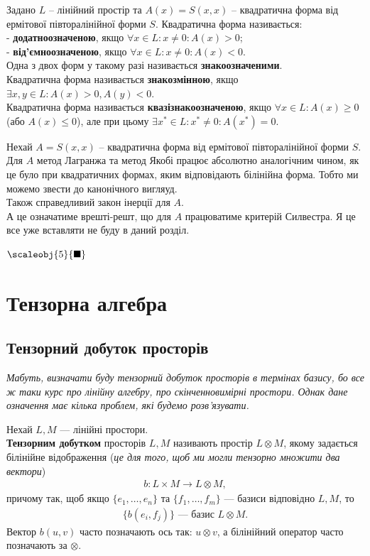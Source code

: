 \documentclass{math_library}
\begin{document}
\begin{definition}
Задано $L$ -- лінійний простір та $A(x) = S(x,x)$ -- квадратична форма від ермітової півторалінійної форми $S$. Квадратична форма називається:\\
- \textbf{додатноозначеною}, якщо $\forall x \in L: x \neq 0: A(x) > 0$;\\
- \textbf{від'ємноозначеною}, якщо $\forall x \in L: x \neq 0: A(x) < 0$.\\
Одна з двох форм у такому разі називається \textbf{знакоозначеними}.
\bigskip \\
Квадратична форма називається \textbf{знакозмінною}, якщо $\exists x,y \in L: A(x) >0, A(y) < 0$.\\
Квадратична форма називається \textbf{квазізнакоозначеною}, якщо $\forall x \in L: A(x) \geq 0$ (або $A(x) \leq 0$), але при цьому $\exists x^* \in L: x^* \neq 0: A(x^*) = 0$.
\end{definition}

\begin{remark}
Нехай $A = S(x,x)$ -- квадратична форма від ермітової півторалінійної форми $S$.
Для $A$ метод Лагранжа та метод Якобі працює абсолютно аналогічним чином, як це було при квадратичних формах, яким відповідають білінійна форма. Тобто ми можемо звести до канонічного вигляуд. \\
Також справедливий закон інерції для $A$. \\
А це означатиме врешті-решт, що для $A$ працюватиме критерій Силвестра. Я це все уже вставляти не буду в даний розділ.
\end{remark}
\fi
$\scaleobj{5}{\blacksquare}$

\newpage

\iffalse
\section{Тензорна алгебра}
\subsection{Тензорний добуток просторів}
\textit{Мабуть, визначати буду тензорний добуток просторів в термінах базису, бо все ж таки курс про лінійну алгебру, про скінченновимірні простори. Однак дане означення має кілька проблем, які будемо розв'язувати.}

\begin{definition}
Нехай $L,M$ --- лінійні простори.\\
\textbf{Тензорним добутком} просторів $L,M$ називають простір $L \otimes M$, якому задається білінійне відображення (\textit{це для того, щоб ми могли тензорно множити два вектори})
\begin{align*}
b \colon L \times M \to L \otimes M,
\end{align*}
причому так, щоб якщо $\{e_1,\dots,e_n\}$ та $\{f_1,\dots,f_m\}$ --- базиси відповідно $L,M$, то
\begin{align*}
\{ b(e_i,f_j) \} \text{ --- базис } L \otimes M.
\end{align*}
Вектор $b(u,v)$ часто позначають ось так: $u \otimes v$, а білінійний оператор часто позначають за $\otimes$.
\end{definition}
\end{document}
